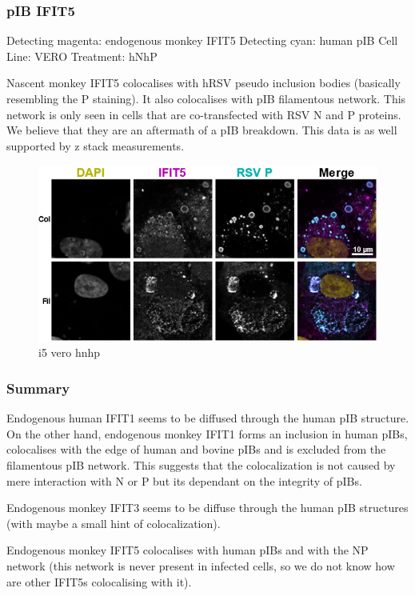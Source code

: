 \subsubsection{pIB IFIT5}
Detecting magenta: endogenous monkey IFIT5 \newline
Detecting cyan: human pIB \newline
Cell Line: VERO \newline
Treatment: hNhP \newline

Nascent monkey IFIT5 colocalises with hRSV pseudo inclusion bodies (basically resembling the P staining). It also colocalises with pIB filamentous network. This network is only seen in cells that are co-transfected with RSV N and P proteins. We believe that they are an aftermath of a pIB breakdown. This data is as well supported by z stack measurements.

\begin{figure}
    \centering
    \includegraphics[width=1\linewidth]{09. Chapter 4/Figs/03. pIB/05. i5 vero hnhp.png}
    \caption[i5 vero hnhp]{i5 vero hnhp}
    \label{fig:i5 vero hnhp}
\end{figure}

\subsubsection{Summary} \label{Summary-pib}
Endogenous human IFIT1 seems to be diffused through the human pIB structure. On the other hand, endogenous monkey IFIT1 forms an inclusion in human pIBs, colocalises with the edge of human and bovine pIBs and is excluded from the filamentous pIB network. This suggests that the colocalization is not caused by mere interaction with N or P but its dependant on the integrity of pIBs.

Endogenous monkey IFIT3 seems to be diffuse through the human pIB structures (with maybe a small hint of colocalization).

Endogenous monkey IFIT5 colocalises with human pIBs and with the NP network (this network is never present in infected cells, so we do not know how are other IFIT5s colocalising with it).
